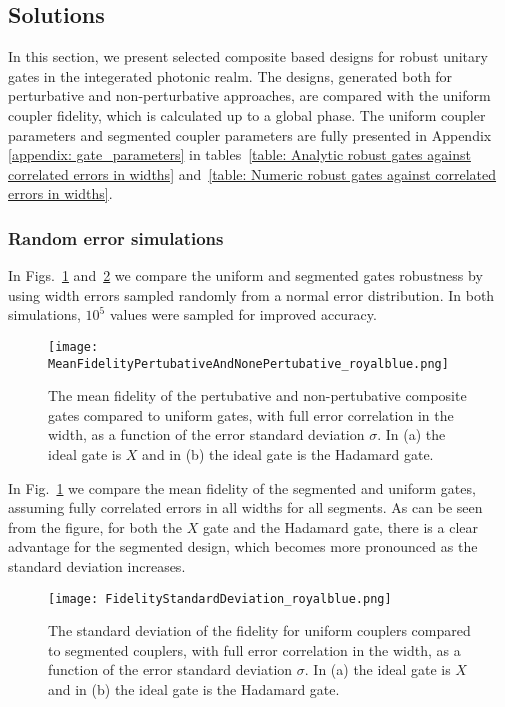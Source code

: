 \documentclass[floatfix,reprint, amsmath,amssymb,aps,superscriptaddress,nofootinbib]{revtex4-2}
\begin{document}
\subsection{Solutions}
In this section, we present selected composite based designs for robust unitary gates in the integerated photonic realm.
The designs, generated both for perturbative and non-perturbative approaches, are compared with the uniform coupler fidelity, which is calculated up to a global phase. The uniform coupler parameters and segmented coupler parameters are fully presented in Appendix \ref{appendix: gate_parameters} in tables~\ref{table: Analytic robust gates against correlated errors in widths} and~\ref{table: Numeric robust gates against correlated errors in widths}. 

\subsubsection{Random error simulations}
In Figs.~\ref{fig: mean perturbative and non perturbative solutions} and~\ref{fig: fidelity std perturbative and non perturbative solutions} we compare the uniform and segmented gates robustness by using width errors sampled randomly from a normal error distribution.
In both simulations, $10^5$ values were sampled for improved accuracy.

\begin{figure}[!h]
     \centering
     \texttt{[image: MeanFidelityPertubativeAndNonePertubative\_royalblue.png]}
     \caption{The mean fidelity of the pertubative and non-pertubative composite gates compared to uniform gates, with full error correlation in the width, as a function of the error standard deviation $\sigma$. In (a) the ideal gate is $X$ and in (b) the ideal gate is the Hadamard gate.
   }
     \label{fig: mean perturbative and non perturbative solutions}
\end{figure}

In Fig.~\ref{fig: mean perturbative and non perturbative solutions} we compare the mean fidelity of the segmented and uniform gates, assuming fully correlated errors in all widths for all segments. As can be seen from the figure, for both the $X$ gate and the Hadamard gate, there is a clear advantage for the segmented design, which becomes more pronounced as the standard deviation increases.


\begin{figure}[!h]
     \centering
     \texttt{[image: FidelityStandardDeviation\_royalblue.png]}
     \caption{The standard deviation of the fidelity for uniform couplers compared to segmented couplers, with full error correlation in the width, as a function
     of the error standard deviation $\sigma$. In (a) the ideal gate is $X$ and in (b) the ideal gate is the Hadamard gate.}
     \label{fig: fidelity std perturbative and non perturbative solutions}
\end{figure}
\end{document}
